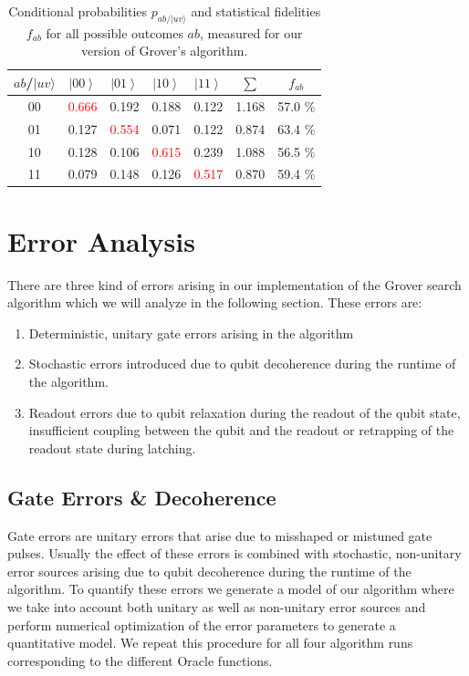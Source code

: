 \begin{table}[H]
\begin{centering}
\begin{tabular}{|c|c|c|c|c|c|c|}
\hline 
$ab$/$|uv\rangle$ & $\left|00\right\rangle $ & $\left|01\right\rangle $ & $\left|10\right\rangle $ & $\left|11\right\rangle $ & $\sum$ & $f_{ab}$\tabularnewline
\hline
\hline 
00 & \textcolor{red}{0.666} & 0.192 & 0.188 & 0.122 & 1.168 & 57.0 \%\tabularnewline
\hline 
01 & 0.127 & \textcolor{red}{0.554} & 0.071 & 0.122 & 0.874 & 63.4 \%\tabularnewline
\hline 
10 & 0.128 & 0.106 & \textcolor{red}{0.615} & 0.239 & 1.088 & 56.5 \%\tabularnewline
\hline 
11 & 0.079 & 0.148 & 0.126 & \textcolor{red}{0.517} & 0.870 & 59.4 \%\tabularnewline
\hline
\end{tabular}
\par\end{centering}

\caption{\label{tab:Probabilities-for-obtaining}Conditional probabilities
$p_{ab/|uv\rangle}$ and statistical fidelities $f_{ab}$ for all
possible outcomes $ab$, measured for our version of Grover's algorithm.}

\end{table}

\section{Error Analysis}

There are three kind of errors arising in our implementation of the Grover search algorithm which we will analyze in the following section. These errors are:

\begin{enumerate}
	\item Deterministic, unitary gate errors arising in the algorithm
	\item Stochastic errors introduced due to qubit decoherence during the runtime of the algorithm.
	\item Readout errors due to qubit relaxation during the readout of the qubit state, insufficient coupling between the qubit and the readout or retrapping of the readout state during latching.
\end{enumerate}

\subsection{Gate Errors \& Decoherence}

Gate errors are unitary errors that arise due to misshaped or mistuned gate pulses. Usually the effect of these errors is combined with stochastic, non-unitary error sources arising due to qubit decoherence during the runtime of the algorithm. To quantify these errors we generate a model of our algorithm where we take into account both unitary as well as non-unitary error sources and perform numerical optimization of the error parameters to generate a quantitative model. We repeat this procedure for all four algorithm runs corresponding to the different Oracle functions.

